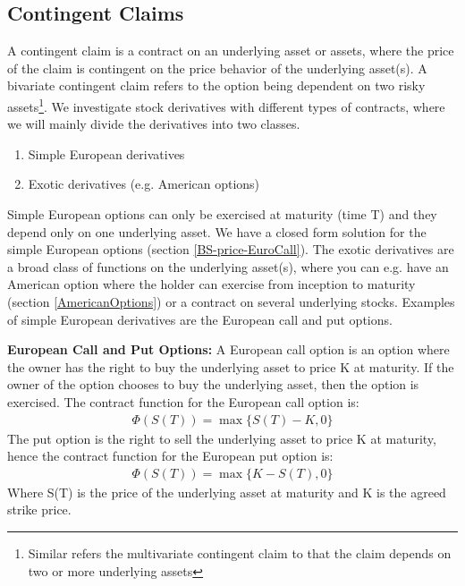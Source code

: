 
\subsection{Contingent Claims}
A contingent claim is a contract on an underlying asset or assets, where the price of the claim is contingent on the price behavior of the underlying asset(s). A bivariate contingent claim refers to the option being dependent on two risky assets\footnote{Similar refers the multivariate contingent claim to that the claim depends on two or more underlying assets}. We investigate stock derivatives with different types of contracts, where we will mainly divide the derivatives into two classes. 
\begin{enumerate}
\item Simple European derivatives
\item Exotic derivatives (e.g. American options)
\end{enumerate}
Simple European options can only be exercised at maturity (time T) and they depend only on one underlying asset. We have a closed form solution for the simple European options (section \ref{BS-price-EuroCall}). The exotic derivatives are a broad class of functions on the underlying asset(s), where you can e.g. have an American option where the holder can exercise from inception to maturity (section \ref{AmericanOptions}) or a contract on several underlying stocks. Examples of simple European derivatives are the European call and put options.

\theoremstyle{definition}
\begin{definition}{\textbf{European Call and Put Options:}}\label{def:CallOptions}
A European call option is an option where the owner has the right to buy the underlying asset to price K at maturity. If the owner of the option chooses to buy the underlying asset, then the option is exercised. The contract function for the European call option is:
\begin{equation*}
\begin{split}
\Phi(S(T))=\max\{S(T)-K, 0\}
\end{split}
\end{equation*}
The put option is the right to sell the underlying asset to price K at maturity, hence the contract function for the European put option is:
\begin{equation*}
\begin{split}
\Phi(S(T))=\max\{K-S(T), 0\}
\end{split}
\end{equation*}
Where S(T) is the price of the underlying asset at maturity and K is the agreed strike price.
\end{definition}

